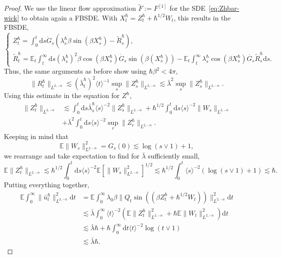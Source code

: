 \documentclass[11pt, a4paper]{scrartcl}
\numberwithin{equation}{section}
\theoremstyle{plain}
\theoremstyle{remark}
\newcommand{\assign}{:=}
\newcommand{\mathd}{\mathrm{d}}
\begin{document}
\begin{proof}
  We use the linear flow approximation $\tilde{F} \assign F^{[1]}$ for the
  SDE~\eqref{eq:Zhbar-wick} to obtain again a FBSDE. With $X^{\hbar}_t =
  Z_t^{\hbar} + \hbar^{1 / 2} W_t$, this results in the FBSDE,
  \[ \begin{cases}
       Z^{\hbar}_t = \int_0^t \mathd s \dot{G}_s (\lambda_s^{\hbar} \beta \sin
       (\beta X^{\hbar}_s) - \tilde{R}_s^{\hbar}),\\
       \tilde{R}_t^{\hbar} =\mathbb{E}_t  \int_t^{\infty} \mathd s
       (\lambda_s^{\hbar})^2 \beta \cos (\beta X^{\hbar}_s)  \dot{G}_s \sin
       \left( \beta (X^{\hbar}_s) \right) -\mathbb{E}_t  \int_t^{\infty}
       \lambda_s^{\hbar} \cos (\beta X^{\hbar}_s) \dot{G_s}
       \tilde{R}^{\hbar}_s \mathd s.
     \end{cases} \]
  Thus, the same arguments as before show using $\hbar \beta^2 < 4 \pi$,
  \[ \| R^{\hbar}_t \|_{L^{2, - n}} \lesssim (\bar{\lambda}^{\hbar}_t)^2 \langle t
     \rangle^{- 1} \sup_s \| Z^{\hbar}_s \|_{L^{2, - n}} \lesssim \bar{\lambda}^2
     \sup_s \| Z^{\hbar}_s \|_{L^{2, - n}} . \]
  Using this estimate in the equation for $Z^{\hbar}$,
  \begin{align*}
    \| Z^{\hbar}_t \|_{L^{2, - n}}
    &\lesssim \int_0^t \mathd s
     \bar{\lambda}_s^{\hbar} \langle s \rangle^{- 2} \| Z^{\hbar}_s \|_{L^{2, - n}}
     + \hbar^{1 / 2} \int_0^t \mathd s \langle s \rangle^{- 2}  \| W_s
     \|_{L^{2, - n}}\\ &+ \bar{\lambda}^2  \int_0^t \mathd s \langle s \rangle^{- 2}
     \sup_r \| Z^{\hbar}_r \|_{L^{2, - n}} . 
  \end{align*}
  Keeping in mind that
  \[ \mathbb{E} \| W_s \|^2_{L^{2, - n}} = G_s (0) \lesssim \log (s \vee 1) +
     1, \]
  we rearrange and take expectation to find for $\bar{\lambda}$ sufficiently small,
  \[ \mathbb{E} \| Z^{\hbar}_t \|_{L^{2, - n}} \lesssim \hbar^{1 / 2}
     \int_0^t \mathd s \langle s \rangle^{- 2} \mathbb{E} [\| W_s \|^2_{L^{2,
     - n}}]^{1 / 2} \lesssim \hbar^{1 / 2} \int_0^t \langle s \rangle^{- 2} 
     (\log (s \vee 1) + 1) \lesssim \hbar . \]
  Putting everything together,
  \[ \begin{aligned}
       \mathbb{E} \int_0^{\infty} \| \bar{u}^{\hbar}_t \|^2_{L^{2, - n}}
       \mathd t &= \mathbb{E} \int_0^{\infty} \lambda_0 \beta \| Q_t \sin
       ((\beta Z_t^{\hbar} + \hbar^{1 / 2} W_t)) \|_{L^{2, - n}}^2 \mathd t\\
       & \lesssim  \bar{\lambda} \int_0^{\infty} \langle t \rangle^{- 2}
       (\mathbb{E} \| Z^{\hbar}_t \|^2_{L^{2, - n}} + \hbar \mathbb{E} \| W_t
       \|^2_{L^{2, - n}}) \mathd t\\
       & \lesssim  \bar{\lambda} \hbar + \hbar \int_0^{\infty} \mathd t \langle t
       \rangle^{- 2} \log (t \vee 1)\\
       & \lesssim  \bar{\lambda} \hbar .
     \end{aligned} \]
  
\end{proof}
\end{document}
